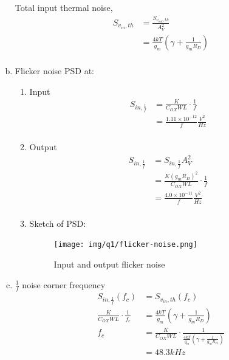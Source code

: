 \documentclass{article}
\begin{document}
\begin{enumerate}[(a)]
Total input thermal noise,
\begin{equation*}
\begin{aligned}
S_{v_{in}, th} &= \frac{S_{v_{out}, th}}{A_{V}^{2}} \\
&= \frac{4kT}{g_{m}}(\gamma{} + \frac{1}{g_{m}R_{D}}) \\
\end{aligned}
\end{equation*}

\item Flicker noise PSD at:
\begin{enumerate}[1.]
\item Input
\begin{equation*}
\begin{aligned}
S_{in, \frac{1}{f}} &= \frac{K}{C_{OX}WL} \cdot \frac{1}{f} \\
&= \frac{1.11 \times 10^{-12}}{f} \frac{V^{2}}{Hz} \\
\end{aligned}
\end{equation*}

\item Output
\begin{equation*}
\begin{aligned}
S_{in, \frac{1}{f}} &= S_{in, \frac{1}{f}}A_{V}^{2} \\
&= \frac{K(g_{m}R_{D})^{2}}{C_{OX}WL} \cdot \frac{1}{f} \\
&= \frac{4.0 \times 10^{-11}}{f} \frac{V^{2}}{Hz} \\
\end{aligned}
\end{equation*}

\item Sketch of PSD:
\begin{figure}[H]
\centering
\texttt{[image: img/q1/flicker-noise.png]}
\caption{\label{fig:flicker-noise-q1}Input and output flicker noise}
\end{figure}
\end{enumerate}

\item \(\frac{1}{f}\) noise corner frequency
\begin{equation*}
\begin{aligned}
S_{in, \frac{1}{f}}(f_{c}) &= S_{v_{in}, th}(f_{c}) \\
\frac{K}{C_{OX}WL} \cdot \frac{1}{f_{c}} &= \frac{4kT}{g_{m}}(\gamma{} + \frac{1}{g_{m}R_{D}}) \\
f_{c} &= \frac{K}{C_{OX}WL} \cdot \frac{1}{\frac{4kT}{g_{m}}(\gamma{} + \frac{1}{g_{m}R_{D}})} \\
&= 48.3 kHz \\


\end{aligned}
\end{equation*}
\end{enumerate}
\end{document}
